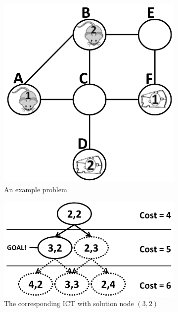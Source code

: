 \documentclass[english]{article}
\begin{document}
	
\begin{figure}[b]
	\centering
	\begin{subfigure}{0.2\textwidth}
		\centering
		\includegraphics[width=\linewidth]{img/mdds1}
		\caption{An example problem}
		\label{fig:problem}
	\end{subfigure}
	\hfill
	\begin{subfigure}{0.3\textwidth}
		\centering
		\includegraphics[width=\linewidth]{img/ict2}
		\caption{The corresponding ICT with solution node $(3,2)$}
		\label{fig:ict2}
	\end{subfigure}
	\hfill
	\begin{subfigure}{0.4\textwidth}

\end{subfigure}
\end{figure}
\end{document}
